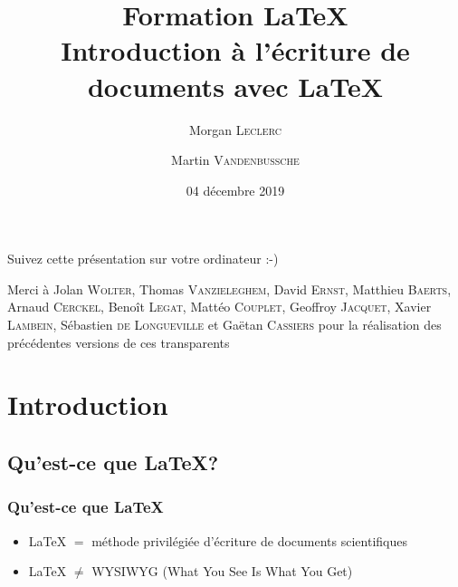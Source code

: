 \documentclass[10pt,svgnames,usenames,table]{beamer} %
\institute{Louvain-li-Nux}
\title{\textbf{Formation \LaTeX}\\
Introduction à l'écriture de documents avec \LaTeX}
\author{Morgan \textsc{Leclerc} \and Martin \textsc{Vandenbussche}}
\date{04 décembre 2019}
\begin{document}
\begin{frame}
  \begin{center}\Large
  Suivez cette présentation sur votre ordinateur :-)
  
  \vspace{1cm}
  \end{center}
\end{frame}



\begin{frame}
  \maketitle
  Merci à Jolan \textsc{Wolter}, Thomas \textsc{Vanzieleghem}, David \textsc{Ernst}, Matthieu \textsc{Baerts}, Arnaud \textsc{Cerckel}, Benoît \textsc{Legat}, Mattéo \textsc{Couplet}, Geoffroy \textsc{Jacquet}, Xavier \textsc{Lambein}, Sébastien \textsc{de Longueville} et Gaëtan \textsc{Cassiers} pour la réalisation des précédentes versions de ces transparents

\end{frame}


\section{Introduction}
\subsection{Qu'est-ce que \LaTeX{}?}
\begin{frame}
\frametitle{Qu'est-ce que \LaTeX}

\begin{itemize}
\item \LaTeX{} $=$ méthode privilégiée d'écriture de documents scientifiques
 \vspace{0.5cm}
\item \LaTeX{} $ \neq$ WYSIWYG (What You See Is What You Get)
\end{itemize}

\end{frame}
\end{document}
